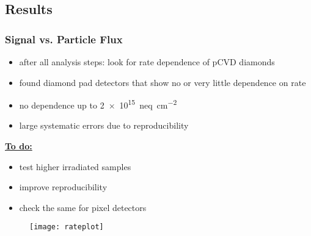 \subsection{Results}
\begin{frame}
	\frametitle{Signal vs. Particle Flux}
	\begin{minipage}[c][.75\textheight]{.5\textwidth}
		\begin{itemize}
			\setlength{\itemsep}{\fill}
			\item after all analysis steps: look for rate dependence of pCVD diamonds
			\item found diamond pad detectors that show no or very little dependence on rate
			\item no dependence up to \SI{2e15}{neq\per cm^2}
			\item large systematic errors due to reproducibility
		\end{itemize}
		\vspace*{3pt}
		\textbf{\underline{To do:}}
		\begin{itemize}
			\setlength{\itemsep}{\fill}
			\item test higher irradiated samples
			\item improve reproducibility
			\item check the same for pixel detectors
		\end{itemize}
	\end{minipage}
	\hspace*{5pt}
	\begin{minipage}{.45\textwidth}
		\begin{figure}
			\centering
			\texttt{[image: rateplot]}
		\end{figure}
	\end{minipage}
\end{frame}
